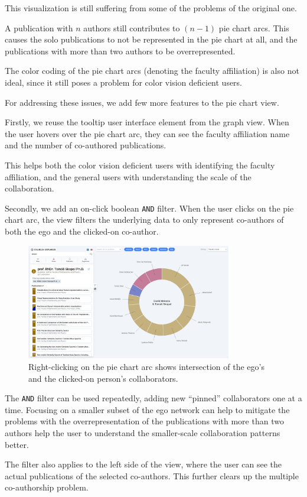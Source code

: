 This visualization is still suffering from some of the problems of the original one. 

A publication with $n$ authors still contributes to $(n-1)$ pie chart arcs. 
This causes the solo publications to not be represented in the pie chart at all, and the publications with more than two authors to be overrepresented.

The color coding of the pie chart arcs (denoting the faculty affiliation) is also not ideal, since it still poses a problem for color vision deficient users.

For addressing these issues, we add few more features to the pie chart view.

Firstly, we reuse the tooltip user interface element from the graph view. 
When the user hovers over the pie chart arc, they can see the faculty affiliation name and the number of co-authored publications.

This helps both the color vision deficient users with identifying the faculty affiliation, and the general users with understanding the scale of the collaboration.

Secondly, we add an on-click boolean \texttt{AND} filter. 
When the user clicks on the pie chart arc, the view filters the underlying data to only represent co-authors of both the ego and the clicked-on co-author.

\begin{figure}[ht!]
    \captionsetup{width=.9\linewidth}
    \includegraphics[width=0.8\textwidth]{../img/pie-chart-filter.png}
    \centering
    \caption{Right-clicking on the pie chart arc shows intersection of the ego's and the clicked-on person's collaborators.}
\end{figure}

The \texttt{AND} filter can be used repeatedly, adding new ``pinned'' collaborators one at a time.
Focusing on a smaller subset of the ego network can help to mitigate the problems with the overrepresentation of the publications with more than two authors
help the user to understand the smaller-scale collaboration patterns better.

The filter also applies to the left side of the view, where the user can see the actual publications of the selected co-authors.
This further clears up the multiple co-authorship problem.

